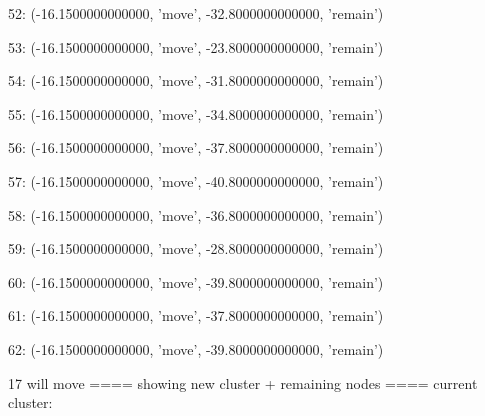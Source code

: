 52: (-16.1500000000000, 'move', -32.8000000000000, 'remain')


53: (-16.1500000000000, 'move', -23.8000000000000, 'remain')


54: (-16.1500000000000, 'move', -31.8000000000000, 'remain')


55: (-16.1500000000000, 'move', -34.8000000000000, 'remain')


56: (-16.1500000000000, 'move', -37.8000000000000, 'remain')


57: (-16.1500000000000, 'move', -40.8000000000000, 'remain')


58: (-16.1500000000000, 'move', -36.8000000000000, 'remain')


59: (-16.1500000000000, 'move', -28.8000000000000, 'remain')


60: (-16.1500000000000, 'move', -39.8000000000000, 'remain')


61: (-16.1500000000000, 'move', -37.8000000000000, 'remain')


62: (-16.1500000000000, 'move', -39.8000000000000, 'remain')


17 will move
==== showing new cluster + remaining nodes ====
current cluster:


